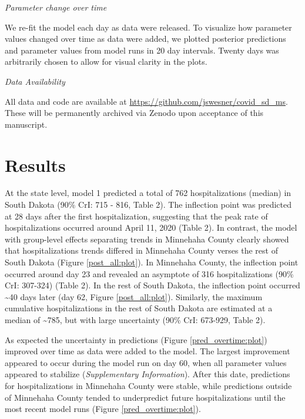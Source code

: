 \documentclass[
]{article}
\begin{document}
\emph{Parameter change over time}

We re-fit the model each day as data were released. To visualize how parameter values changed over time as data were added, we plotted posterior predictions and parameter values from model runs in 20 day intervals. Twenty days was arbitrarily chosen to allow for visual clarity in the plots.

\emph{Data Availability}

All data and code are available at \url{https://github.com/jswesner/covid_sd_ms}. These will be permanently archived via Zenodo upon acceptance of this manuscript.

\hypertarget{results}{%
\section{Results}\label{results}}

At the state level, model 1 predicted a total of 762 hospitalizations (median) in South Dakota (90\% CrI: 715 - 816, Table 2). The inflection point was predicted at 28 days after the first hospitalization, suggesting that the peak rate of hospitalizations occurred around April 11, 2020 (Table 2). In contrast, the model with group-level effects separating trends in Minnehaha County clearly showed that hospitalizations trends differed in Minnehaha County verses the rest of South Dakota (Figure \ref{post_all:plot}). In Minnehaha County, the inflection point occurred around day 23 and revealed an asymptote of 316 hospitalizations (90\% CrI: 307-324) (Table 2). In the rest of South Dakota, the inflection point occurred \textasciitilde40 days later (day 62, Figure \ref{post_all:plot}). Similarly, the maximum cumulative hospitalizations in the rest of South Dakota are estimated at a median of \textasciitilde785, but with large uncertainty (90\% CrI: 673-929, Table 2).

As expected the uncertainty in predictions (Figure \ref{pred_overtime:plot}) improved over time as data were added to the model. The largest improvement appeared to occur during the model run on day 60, when all parameter values appeared to stabilize (\emph{Supplementary Information}). After this date, predictions for hospitalizations in Minnehaha County were stable, while predictions outside of Minnehaha County tended to underpredict future hospitalizations until the most recent model runs (Figure \ref{pred_overtime:plot}).
\end{document}
